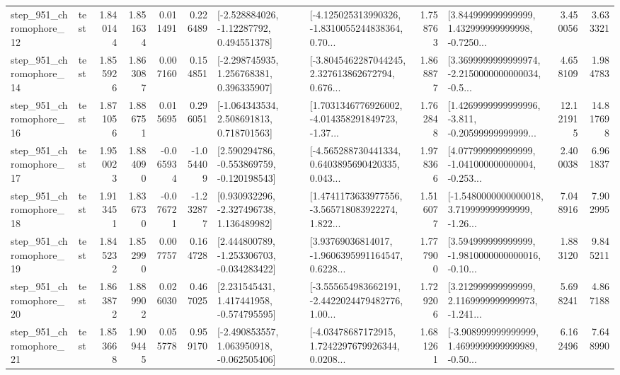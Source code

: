 \begin{tabular}{llrrrrllrlrr}
  step\_951\_chromophore\_12 &      test &      1.840144 &    1.851634 &      0.011491 &  0.226489 &    [-2.528884026, -1.12287792, 0.494551378] &  [-4.125025313990326, -1.8310055244838364, 0.70... &       1.758763 &  [3.844999999999999, 1.432999999999998, -0.7250... &            3.450056 &          3.633321 \\
  step\_951\_chromophore\_14 &      test &      1.855926 &    1.863087 &      0.007160 &  0.154851 &    [-2.298745935, 1.256768381, 0.396335907] &  [-3.8045462287044245, 2.327613862672794, 0.676... &       1.868877 &  [3.3699999999999974, -2.2150000000000034, -0.5... &            4.658109 &          1.984783 \\
  step\_951\_chromophore\_16 &      test &      1.871056 &    1.886751 &      0.015695 &  0.296051 &    [-1.064343534, 2.508691813, 0.718701563] &  [1.7031346776926002, -4.014358291849723, -1.37... &       1.762848 &  [1.4269999999999996, -3.811, -0.20599999999999... &           12.121915 &         14.817698 \\
  step\_951\_chromophore\_17 &      test &      1.950023 &    1.884090 &     -0.065934 & -1.054409 &   [2.590294786, -0.553869759, -0.120198543] &  [-4.565288730441334, 0.6403895690420335, 0.043... &       1.978366 &  [4.077999999999999, -1.041000000000004, -0.253... &            2.400038 &          6.961837 \\
  step\_951\_chromophore\_18 &      test &      1.913451 &    1.836730 &     -0.076721 & -1.232877 &    [0.930932296, -2.327496738, 1.136489982] &  [1.4741173633977556, -3.565718083922274, 1.822... &       1.516077 &  [-1.5480000000000018, 3.719999999999999, -1.26... &            7.048916 &          7.902995 \\
  step\_951\_chromophore\_19 &      test &      1.845232 &    1.852990 &      0.007757 &  0.164728 &   [2.444800789, -1.253306703, -0.034283422] &  [3.93769036814017, -1.9606395991164547, 0.6228... &       1.777900 &  [3.594999999999999, -1.9810000000000016, -0.10... &            1.883120 &          9.845211 \\
  step\_951\_chromophore\_20 &      test &      1.863872 &    1.889902 &      0.026030 &  0.467025 &    [2.231545431, 1.417441958, -0.574795595] &  [-3.555654983662191, -2.4422024479482776, 1.00... &       1.729206 &  [3.212999999999999, 2.1169999999999973, -1.241... &            5.698241 &          4.867188 \\
  step\_951\_chromophore\_21 &      test &      1.853668 &    1.909445 &      0.055778 &  0.959170 &   [-2.490853557, 1.063950918, -0.062505406] &  [-4.03478687172915, 1.7242297679926344, 0.0208... &       1.681261 &  [-3.908999999999999, 1.4699999999999989, -0.50... &            6.162496 &          7.648990 \\

\end{tabular}
